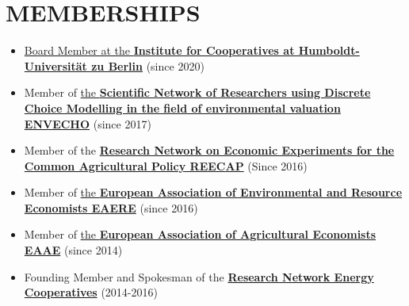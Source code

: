 \documentclass[paper=a4,fontsize=11pt]{scrartcl} %
\newcommand{\NewPart}[2]{\section*{\uppercase{#1} #2}}
\begin{document}
\NewPart{Memberships}{}

\begin{itemize}

\item{\href{https://www.agrar.hu-berlin.de/de/institut/departments/daoe/koopwiss/ifg/Institut/vorstand_mitglieder}{Board Member at the \textbf{Institute for Cooperatives at Humboldt-Universität zu Berlin}}} (since 2020)

\item Member of \href{http://www.envecho.com/index.html}{the \textbf{Scientific Network of Researchers using Discrete Choice Modelling in the field of environmental valuation ENVECHO}} (since 2017) 

\item Member of the \href{https://sites.google.com/view/reecap}{\textbf{Research Network on Economic Experiments for the Common Agricultural Policy REECAP}} (Since 2016)

\item Member of {\href{https://www.eaere.org/}{ the \textbf{European Association of Environmental and Resource Economists EAERE}}} (since 2016)

\item Member of {\href{https://eaae.org/}{the \textbf{European Association of Agricultural Economists EAAE}}} (since 2014)

\item Founding Member and Spokesman of the {\href{http://forschungsnetzwerk-energiegenossenschaften.de}{\textbf{Research Network Energy Cooperatives}}} (2014-2016)

\end{itemize}
\end{document}
